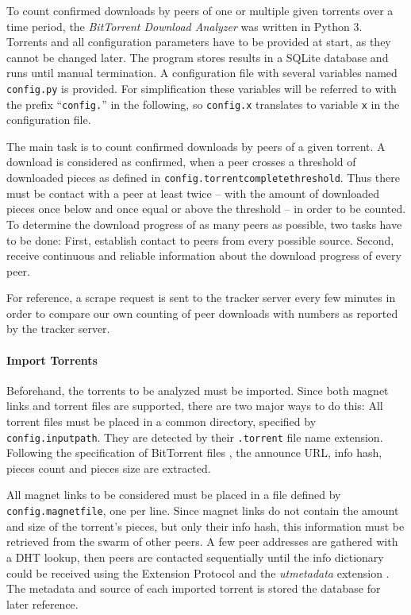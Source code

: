\documentclass[10pt, a4paper, twoside, headsepline]{scrbook}
\renewcommand{\_}{\origunderscore\allowbreak}
\newcommand{\config}[1]{\texttt{config.\allowbreak #1}}
\begin{document}
To count confirmed downloads by peers of one or multiple given torrents over a time period, the \emph{BitTorrent Download Analyzer} was written in Python 3. Torrents and all configuration parameters have to be provided at start, as they cannot be changed later. The program stores results in a SQLite database and runs until manual termination. A configuration file with several variables named \texttt{config.py} is provided. For simplification these variables will be referred to with the prefix ``\texttt{config.}'' in the following, so \config{x} translates to variable \texttt{x} in the configuration file.

The main task is to count confirmed downloads by peers of a given torrent. A download is considered as confirmed, when a peer crosses a threshold of downloaded pieces as defined in \config{torrent\_complete\_threshold}. Thus there must be contact with a peer at least twice -- with the amount of downloaded pieces once below and once equal or above the threshold -- in order to be counted. To determine the download progress of as many peers as possible, two tasks have to be done: First, establish contact to peers from every possible source. Second, receive continuous and reliable information about the download progress of every peer.

For reference, a scrape request is sent to the tracker server every few minutes in order to compare our own counting of peer downloads with numbers as reported by the tracker server.

\paragraph{Import Torrents}
Beforehand, the torrents to be analyzed must be imported. Since both magnet links and torrent files are supported, there are two major ways to do this: All torrent files must be placed in a common directory, specified by \config{input\_path}. They are detected by their \texttt{.torrent} file name extension. Following the specification of BitTorrent files \cite{bep3}, the announce URL, info hash, pieces count and pieces size are extracted.

All magnet links \cite{bep9} to be considered must be placed in a file defined by \config{magnet\_file}, one per line. Since magnet links do not contain the amount and size of the torrent's pieces, but only their info hash, this information must be retrieved from the swarm of other peers. A few peer addresses are gathered with a DHT lookup, then peers are contacted sequentially until the info dictionary could be received using the Extension Protocol \cite{bep10} and the \emph{ut\_metadata} extension \cite{bep9}. The metadata and source of each imported torrent is stored the database for later reference.
\end{document}

